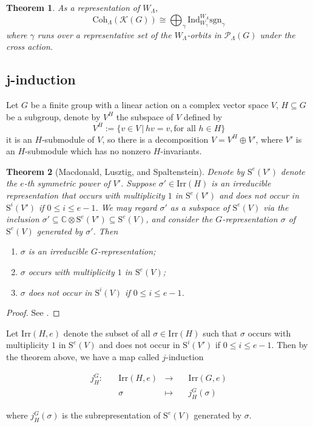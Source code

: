 \documentclass[12pt, a4paper]{amsart}
\numberwithin{equation}{section}
\newtheorem{thm}{Theorem}[section]
\newcommand{\BC}{{\mathbb {C}}}
\newcommand{\CK}{{\mathcal {K}}}
\newcommand{\CP}{{\mathcal {P}}}
\newcommand{\Irr}{{\mathrm{Irr}}}
\newcommand{\sgn}{{\mathrm{sgn}}}
\newcommand{\set}[2]{\{#1\,|\,#2\}}
\newcommand{\defmap}[5]{
           \begin{equation*}
              \begin{aligned}
                   #1:\quad  & #2 &\longrightarrow &\quad #3 \\
                      \quad  & #4    &\longmapsto  &\quad #5
              \end{aligned}
           \end{equation*}
          }
\begin{document}
\begin{thm}\label{Coh} 
As a representation of $W_{\Lambda}$,
    \begin{equation}
        \mathrm{Coh}_{\Lambda}(\CK(G)) \cong \bigoplus_{\gamma} \mathrm{Ind}_{W_{\gamma}}^{W_{\Lambda}} \sgn_{\gamma}
    \end{equation}
    where $\gamma$ runs over a representative set of the $W_{\Lambda}$-orbits in $\CP_{\Lambda}(G)$ under the cross action.
\end{thm}


\subsection{j-induction}\label{2.2}
Let $G$ be a finite group with a linear action on a complex vector space $V$, $H \subseteq G$ be a subgroup, denote by $V^{H}$ the subspace of $V$ defined by
$$V^H := \set{v \in V}{hv = v, \textrm{for all $h \in H$}}$$
it is an $H$-submodule of $V$, so there is a decomposition $V = V^H \oplus V'$, where $V'$ is an $H$-submodule which has no nonzero $H$-invariants.

\begin{thm}[Macdonald, Lusztig, and Spaltenstein]\label{j-ind}
    Denote by $\mathrm{S}^e(V')$ denote the $e$-th symmetric power of $V'$. Suppose $\sigma' \in \Irr(H)$ is an irreducible representation that occurs with multiplicity $1$ in $\mathrm{S}^e(V')$ and does not occur in $\mathrm{S}^{i}(V')$ if $0 \leq i \leq e-1$. We may regard $\sigma'$ as a subspace of $\mathrm{S}^e(V)$ via the inclusion $\sigma' \subseteq \BC \otimes \mathrm{S}^e(V') \subseteq \mathrm{S}^e(V)$, and consider the $G$-representation $\sigma$ of $\mathrm{S}^e(V)$ generated by $\sigma'$. Then
    \begin{enumerate}
        \item $\sigma$ is an irreducible $G$-representation;
        \item $\sigma$ occurs with multiplicity $1$ in $\mathrm{S}^e(V)$;
        \item $\sigma$ does not occur in $\mathrm{S}^{i}(V)$ if $0 \leq i \leq e-1$.
    \end{enumerate}
\end{thm}

\begin{proof}
    See \cite[Theorem 11.2.1]{Car}.
\end{proof}

Let $\Irr(H,e)$ denote the subset of all $\sigma \in \Irr(H)$ such that $\sigma$ occurs with multiplicity $1$ in $\mathrm{S}^e(V)$ and does not occur in $\mathrm{S}^{i}(V')$ if $0 \leq i \leq e-1$.  Then by the theorem above, we have a map called $j$-induction
\defmap{j_H^G}{\Irr(H,e)}{\Irr(G,e)}{\sigma}{j_{H}^{G}(\sigma)}
where $j_{H}^{G}(\sigma)$ is the subrepresentation of $\mathrm{S}^e(V)$ generated by $\sigma$.
\end{document}
